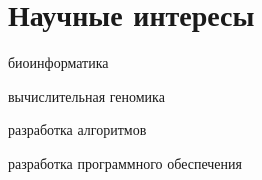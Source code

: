 \section{Научные интересы}
\begin{innerlist}
\item биоинформатика
\item вычислительная геномика
\item разработка алгоритмов
\item разработка программного обеспечения
\end{innerlist}
